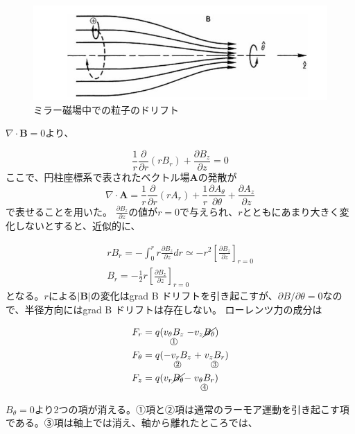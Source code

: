 \documentclass{ltjsarticle}
\numberwithin{equation}{section} %
\newcommand{\underlab}[3][.35ex]{%
  \mathrel{\mathop{#2}\limits_{\mathclap{\lower#1\hbox{\text{\footnotesize\textcircled{\scriptsize #3}}}}}}%
}
\begin{document}
\begin{figure}[htbp]
  \centering
  \includegraphics[width=0.7\linewidth]{magnetic_mirror.png}
  \caption{ミラー磁場中での粒子のドリフト}
  \label{fig.mirror}
\end{figure}

$\nabla \cdot \bm{B} = 0$より、

\begin{equation}
  \frac{1}{r}\frac{\partial}{\partial r}(rB_r) + \frac{\partial B_z}{\partial z} = 0
\end{equation}
ここで、円柱座標系で表されたベクトル場$\bm{A}$の発散が
\[
  \nabla \cdot \bm{A} = \frac{1}{r}\frac{\partial}{\partial r}(rA_r) + \frac{1}{r}\frac{\partial A_\theta}{\partial \theta} + \frac{\partial A_z}{\partial z}
\]
で表せることを用いた。
$\frac{\partial B_z}{\partial z}$の値が$r=0$で与えられ、$r$とともにあまり大きく変化しないとすると、近似的に、

\begin{equation}
  \begin{gathered}
    rB_r = -\int_{0}^{r} r\frac{\partial B_z}{\partial z}dr \simeq -r^2\left[\frac{\partial B_z}{\partial z}\right]_{r=0}\\
    B_r = -\frac{1}{2}r\left[\frac{\partial B_z}{\partial z}\right]_{r=0}    
  \end{gathered} \label{term1234}
\end{equation}
となる。$r$による$|\bm{B}|$の変化はgrad B ドリフトを引き起こすが、$\partial B/\partial \theta = 0$なので、半径方向にはgrad B ドリフトは存在しない。
ローレンツ力の成分は

\begin{align}
  \begin{split}
    F_r     &= q(\underlab{v_\theta B_z}{1}-v_z \cancel{B_\theta})\\
    F_\theta&= q(\underlab{-v_r B_z}{2}+\underlab{v_z B_r}{3})\\
    F_z     &= q(v_r \cancel{B_\theta}-\underlab{v_\theta B_r}{4})
  \end{split}
\end{align}

$B_\theta = 0$より2つの項が消える。➀項と➁項は通常のラーモア運動を引き起こす項である。➂項は軸上では消え、軸から離れたところでは、
\end{document}
